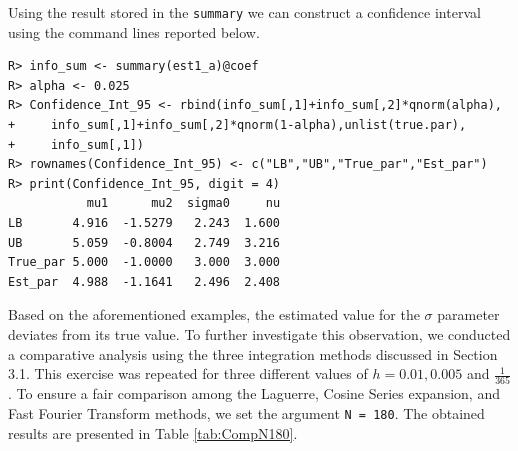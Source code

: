Using the result stored in the \texttt{summary} we can construct a confidence interval using the command lines reported below.

\begin{verbatim}
R> info_sum <- summary(est1_a)@coef
R> alpha <- 0.025
R> Confidence_Int_95 <- rbind(info_sum[,1]+info_sum[,2]*qnorm(alpha),
+     info_sum[,1]+info_sum[,2]*qnorm(1-alpha),unlist(true.par),
+     info_sum[,1])
R> rownames(Confidence_Int_95) <- c("LB","UB","True_par","Est_par")
R> print(Confidence_Int_95, digit = 4)
           mu1      mu2  sigma0     nu
LB       4.916  -1.5279   2.243  1.600
UB       5.059  -0.8004   2.749  3.216
True_par 5.000  -1.0000   3.000  3.000
Est_par  4.988  -1.1641   2.496  2.408
\end{verbatim}

Based on the aforementioned examples, the estimated value for the \(\sigma\) parameter deviates from its true value. To further investigate this observation, we conducted a comparative analysis using the three integration methods discussed in Section 3.1. This exercise was repeated for three different values of \(h= 0.01, 0.005\) and \(\frac{1}{365}\). To ensure a fair comparison among the Laguerre, Cosine Series expansion, and Fast Fourier Transform methods, we set the argument \texttt{N\ =\ 180}. The obtained results are presented in Table \ref{tab:CompN180}.

